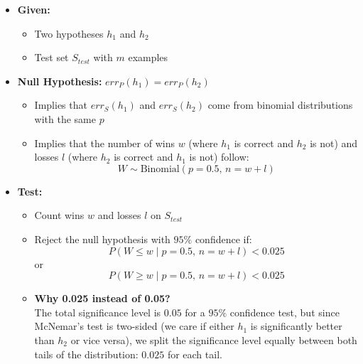 \begin{itemize}
    \item \textbf{Given:}
    \begin{itemize}
        \item Two hypotheses $h_1$ and $h_2$
        \item Test set $S_{test}$ with $m$ examples
    \end{itemize}
    \item \textbf{Null Hypothesis:} $err_P(h_1) = err_P(h_2)$
    \begin{itemize}
        \item Implies that $err_S(h_1)$ and $err_S(h_2)$ come from binomial distributions with the same $p$
        \item Implies that the number of wins $w$ (where $h_1$ is correct and $h_2$ is not) and losses $l$ (where $h_2$ is correct and $h_1$ is not) follow:
        \[
            W \sim \text{Binomial}(p=0.5,\, n=w+l)
        \]
    \end{itemize}
    \item \textbf{Test:}
    \begin{itemize}
        \item Count wins $w$ and losses $l$ on $S_{test}$
        \item Reject the null hypothesis with $95\%$ confidence if:
        \[
            P(W \leq w \mid p=0.5,\, n=w+l) < 0.025
        \]
        or
        \[
            P(W \geq w \mid p=0.5,\, n=w+l) < 0.025
        \]
        \item \textbf{Why 0.025 instead of 0.05?} \\
        The total significance level is $0.05$ for a $95\%$ confidence test, but since McNemar's test is two-sided (we care if either $h_1$ is significantly better than $h_2$ or vice versa), we split the significance level equally between both tails of the distribution: $0.025$ for each tail.
    \end{itemize}
\end{itemize}